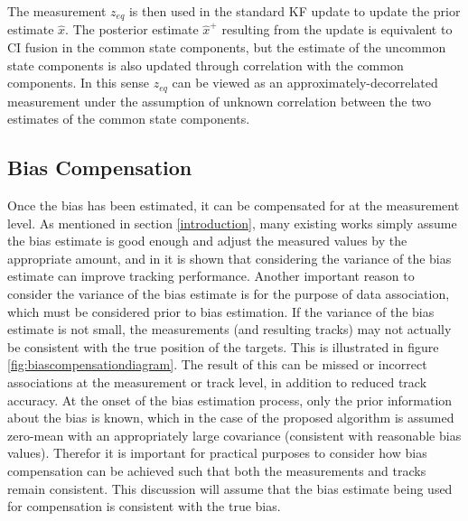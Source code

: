 \documentclass[journal]{IEEEtran}
\begin{document}
The measurement $z_{eq}$ is then used in the standard KF update to update the prior estimate $\hat{x}$. The posterior estimate $\hat{x}^{+}$ resulting from the update is equivalent to CI fusion in the common state components, but the estimate of the uncommon state components is also updated through correlation with the common components. In this sense $z_{eq}$ can be viewed as an approximately-decorrelated measurement under the assumption of unknown correlation between the two estimates of the common state components.

\subsection{Bias Compensation} \label{biascompensation}
Once the bias has been estimated, it can be compensated for at the measurement level. As mentioned in section \ref{introduction}, many existing works simply assume the bias estimate is good enough and adjust the measured values by the appropriate amount, and in \cite{ying20103d} it is shown that considering the variance of the bias estimate can improve tracking performance. Another important reason to consider the variance of the bias estimate is for the purpose of data association, which must be considered prior to bias estimation. If the variance of the bias estimate is not small, the measurements (and resulting tracks) may not actually be consistent with the true position of the targets. This is illustrated in figure \ref{fig:biascompensationdiagram}. The result of this can be missed or incorrect associations at the measurement or track level, in addition to reduced track accuracy. At the onset of the bias estimation process, only the prior information about the bias is known, which in the case of the proposed algorithm is assumed zero-mean with an appropriately large covariance (consistent with reasonable bias values). Therefor it is important for practical purposes to consider how bias compensation can be achieved such that both the measurements and tracks remain consistent. This discussion will assume that the bias estimate being used for compensation is consistent with the true bias.
\end{document}
